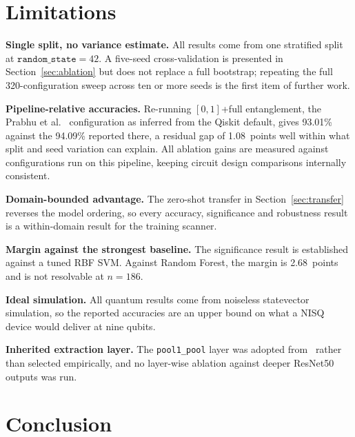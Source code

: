 \documentclass[10pt,conference]{IEEEtran}
\begin{document}
\section{Limitations}

\textbf{Single split, no variance estimate.} All results come from one
stratified split at $\texttt{random\_state}\!=\!42$. A five-seed
cross-validation is presented in Section~\ref{sec:ablation} but does
not replace a full bootstrap; repeating the full 320-configuration sweep
across ten or more seeds is the first item of further work.

\textbf{Pipeline-relative accuracies.} Re-running $[0,1]$+full
entanglement, the Prabhu et al.~\cite{prabhu2023} configuration as
inferred from the Qiskit default, gives 93.01\% against the 94.09\%
reported there, a residual gap of 1.08~points well within what split
and seed variation can explain. All ablation gains are measured against
configurations run on this pipeline, keeping circuit design comparisons
internally consistent.

\textbf{Domain-bounded advantage.} The zero-shot transfer in
Section~\ref{sec:transfer} reverses the model ordering, so every
accuracy, significance and robustness result is a within-domain result
for the training scanner.

\textbf{Margin against the strongest baseline.} The significance result
is established against a tuned RBF SVM. Against Random Forest, the
margin is 2.68~points and is not resolvable at $n\!=\!186$.

\textbf{Ideal simulation.} All quantum results come from noiseless
statevector simulation, so the reported accuracies are an upper bound on
what a NISQ device would deliver at nine qubits.

\textbf{Inherited extraction layer.} The \texttt{pool1\_pool} layer was
adopted from~\cite{prabhu2023} rather than selected empirically, and no
layer-wise ablation against deeper ResNet50 outputs was run.

\section{Conclusion}
\end{document}
